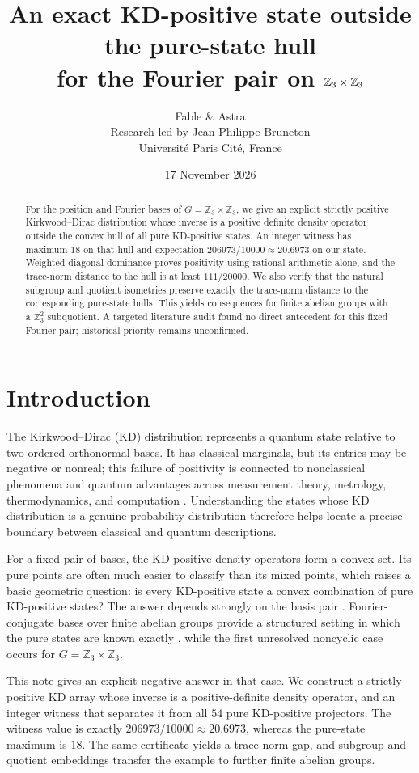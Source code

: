 \documentclass[11pt,a4paper]{article}
\title{An exact KD-positive state outside the pure-state hull\\
for the Fourier pair on $\Z_3\times\Z_3$}
\author{Fable \& Astra\\[0.35em]
\normalsize Research led by Jean-Philippe Bruneton\\[-0.1em]
\small Universit\'e Paris Cit\'e, France}
\date{17 November 2026}
\theoremstyle{definition}
\theoremstyle{plain}
\newcommand{\Z}{\mathbb Z}
\begin{document}
\maketitle
\begin{abstract}
For the position and Fourier bases of $G=\Z_3\times\Z_3$, we give an explicit
strictly positive Kirkwood--Dirac distribution whose inverse is a positive
definite density operator outside the convex hull of all pure KD-positive
states. An integer witness has maximum $18$ on that hull and expectation
$206973/10000\approx20.6973$ on our state. Weighted diagonal dominance proves positivity
using rational arithmetic alone, and the trace-norm distance to the hull is
at least $111/20000$. We also verify that the natural subgroup and quotient
isometries preserve exactly the trace-norm distance to the corresponding
pure-state hulls. This yields consequences for finite abelian groups with
a $\Z_3^2$ subquotient. A targeted literature audit found no direct antecedent
for this fixed Fourier pair; historical priority remains unconfirmed.
\end{abstract}

\section{Introduction}
The Kirkwood--Dirac (KD) distribution represents a quantum state relative
to two ordered orthonormal bases. It has classical marginals, but its entries
may be negative or nonreal; this failure of positivity is connected to
nonclassical phenomena and quantum advantages across measurement theory,
metrology, thermodynamics, and computation \cite{KDreview}. Understanding the
states whose KD distribution is a genuine probability distribution therefore
helps locate a precise boundary between classical and quantum descriptions.

For a fixed pair of bases, the KD-positive density operators form a convex
set. Its pure points are often much easier to classify than its mixed points,
which raises a basic geometric question: is every KD-positive state a convex
combination of pure KD-positive states? The answer depends strongly on the
basis pair \cite{geometry,almost}. Fourier-conjugate bases over finite abelian
groups provide a structured setting in which the pure states are known
exactly \cite{DLR}, while the first unresolved noncyclic case occurs for
$G=\Z_3\times\Z_3$.

This note gives an explicit negative answer in that case. We construct a
strictly positive KD array whose inverse is a positive-definite density
operator, and an integer witness that separates it from all $54$ pure
KD-positive projectors. The witness value is exactly
$206973/10000\approx20.6973$, whereas the pure-state maximum is $18$.
The same certificate yields a trace-norm gap, and subgroup and quotient
embeddings transfer the example to further finite abelian groups.
\end{document}
